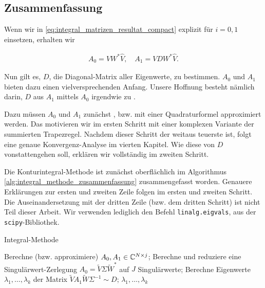 \subsection*{Zusammenfassung}

Wenn wir in \eqref{eq:integral_matrizen_resultat_compact} explizit für $i = 0, 1$ einsetzen, erhalten wir

\begin{align} \label{eq:integral_matrizen_resultat}
    A_0 = V W^\ast \hat V,
    \quad
    A_1 = V D W^\ast \hat V.
\end{align}

Nun gilt es, $D$, die Diagonal-Matrix aller Eigenwerte, zu bestimmen.
$A_0$ und $A_1$ bieten dazu einen vielversprechenden Anfang.
Unsere Hoffnung besteht nämlich darin, $D$ aus $A_1$ mittels $A_0$ irgendwie zu .

Dazu müssen $A_0$ und $A_1$ zunächst , bzw. mit einer Quadraturformel approximiert werden.
Das motivieren wir im ersten Schritt mit einer komplexen Variante der summierten Trapezregel.
Nachdem dieser Schritt der weitaus teuerste ist, folgt eine genaue Konvergenz-Analyse im vierten Kapitel.
Wie diese  von $D$ vonstattengehen soll, erklären wir vollständig im zweiten Schritt.

Die Konturintegral-Methode ist zunächst oberflächlich im Algorithmus \ref{alg:integral_methode_zusammenfassung} zusammengefasst worden.
Genauere Erklärungen zur ersten und zweiten Zeile folgen im ersten und zweiten Schritt.
Die Auseinandersetzung mit der dritten Zeile (bzw. dem dritten Schritt) ist nicht Teil dieser Arbeit.
Wir verwenden lediglich den Befehl \texttt{linalg.eigvals}, aus der \texttt{scipy}-Bibliothek.

\begin{algorithm}[H]
	\caption{Integral-Methode}
    \begin{algorithmic}[0]
            \State Berechne (bzw. approximiere) $A_0, A_1 \in \mathbb{C}^{N \times j}$;
            \State Berechne und reduziere eine Singulärwert-Zerlegung $A_0 = \tilde V \Sigma \tilde W^\ast$ auf $J$ Singulärwerte;
            \State Berechne Eigenwerte $\lambda_1, \dots, \lambda_k$ der Matrix $\tilde V A_1 \tilde W \Sigma^{-1} \sim D$;
            \State \Return $\lambda_1, \dots, \lambda_k$
		\EndProcedure
    \end{algorithmic}
    \caption{}
    \label{alg:integral_methode_zusammenfassung}
\end{algorithm}
